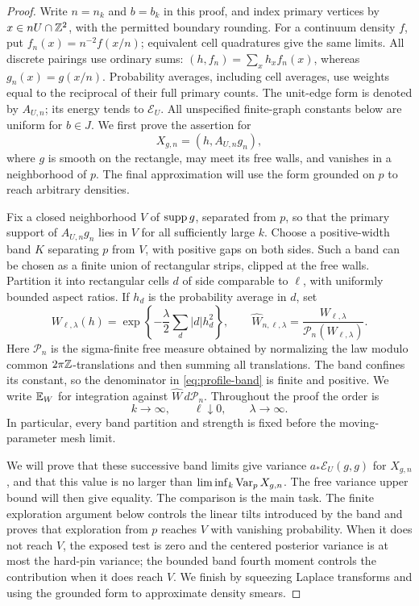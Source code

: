 \begin{proof}
Write \(n=n_k\) and \(b=b_k\) in this proof, and index primary vertices
by \(x\in nU\cap\mathbb Z^2\), with the permitted boundary rounding.
For a continuum density \(f\), put \(f_n(x)=n^{-2}f(x/n)\);
equivalent cell quadratures give the same limits.  All discrete
pairings use ordinary sums: \((h,f_n)=\sum_xh_xf_n(x)\), whereas
\(g_n(x)=g(x/n)\).  Probability averages, including cell averages,
use weights equal to the reciprocal of their full primary counts.
The unit-edge form is denoted by \(A_{U,n}\); its energy tends to
\(\mathcal E_U\).  All unspecified finite-graph constants below are
uniform for \(b\in J\).  We first prove the assertion for
\[
                     X_{g,n}=(h,A_{U,n}g_n),
\]
where \(g\) is smooth on the rectangle, may meet its free walls, and
vanishes in a neighborhood of \(p\).  The final approximation will use
the form grounded on \(p\) to reach arbitrary densities.

Fix a closed neighborhood \(V\) of \(\operatorname{supp} g\), separated from \(p\),
so that the primary support of \(A_{U,n}g_n\) lies in \(V\) for all
sufficiently large \(k\).  Choose a positive-width band \(K\)
separating \(p\) from \(V\), with positive gaps on both sides.
Such a band can be chosen as a finite union of rectangular strips, clipped at the free
walls.  Partition it into rectangular cells \(d\) of side comparable
to \(\ell\), with uniformly bounded aspect ratios.  If \(h_d\) is the
probability average in \(d\), set
\begin{equation}\label{eq:profile-band}
 W_{\ell,\lambda}(h)
   =\exp\left\{-\frac\lambda2\sum_d|d|h_d^2\right\},
 \qquad
 \widehat W_{n,\ell,\lambda}
   =\frac{W_{\ell,\lambda}}{\mathcal P_n(W_{\ell,\lambda})}.
\end{equation}
Here \(\mathcal P_n\) is the sigma-finite free measure obtained by
normalizing the law modulo common \(2\pi\mathbb Z\)-translations and then
summing all translations.  The band confines its constant, so the
denominator in \eqref{eq:profile-band} is finite and positive.  We write
\(\mathbb E_W\) for integration against \(\widehat W\,d\mathcal P_n\).
Throughout the proof the order is
\begin{equation}\label{eq:profile-band-order}
                k\to\infty,\qquad \ell\downarrow0,
                \qquad \lambda\to\infty.
\end{equation}
In particular, every band partition and strength is fixed before the
moving-parameter mesh limit.

We will prove that these successive band limits give variance
\(a_*\mathcal E_U(g,g)\) for \(X_{g,n}\), and that this value is
no larger than \(\liminf_k\operatorname{Var}_pX_{g,n}\). The free variance upper
bound will then give equality. The comparison is the main task.
The finite exploration argument below controls the linear tilts
introduced by the band and proves that exploration from \(p\) reaches
\(V\) with vanishing probability. When it does not reach \(V\),
the exposed test is zero and the centered posterior variance is at
most the hard-pin variance; the bounded band fourth moment controls
the contribution when it does reach \(V\). We finish by squeezing
Laplace transforms and using the grounded form to approximate density
smears.


\end{proof}
